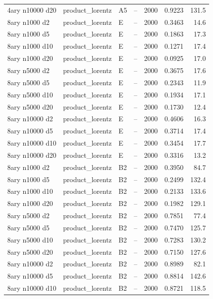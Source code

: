 \begin{longtable}{llllrrr}
4ary n10000 d20 & product\_lorentz & A5 & -- & 2000 & 0.9223 & 131.5 \\
8ary n1000 d2 & product\_lorentz & E & -- & 2000 & 0.3463 & 14.6 \\
8ary n1000 d5 & product\_lorentz & E & -- & 2000 & 0.1863 & 17.3 \\
8ary n1000 d10 & product\_lorentz & E & -- & 2000 & 0.1271 & 17.4 \\
8ary n1000 d20 & product\_lorentz & E & -- & 2000 & 0.0925 & 17.0 \\
8ary n5000 d2 & product\_lorentz & E & -- & 2000 & 0.3675 & 17.6 \\
8ary n5000 d5 & product\_lorentz & E & -- & 2000 & 0.2343 & 11.9 \\
8ary n5000 d10 & product\_lorentz & E & -- & 2000 & 0.1934 & 17.1 \\
8ary n5000 d20 & product\_lorentz & E & -- & 2000 & 0.1730 & 12.4 \\
8ary n10000 d2 & product\_lorentz & E & -- & 2000 & 0.4606 & 16.3 \\
8ary n10000 d5 & product\_lorentz & E & -- & 2000 & 0.3714 & 17.4 \\
8ary n10000 d10 & product\_lorentz & E & -- & 2000 & 0.3454 & 17.7 \\
8ary n10000 d20 & product\_lorentz & E & -- & 2000 & 0.3316 & 13.2 \\
8ary n1000 d2 & product\_lorentz & B2 & -- & 2000 & 0.3950 & 84.7 \\
8ary n1000 d5 & product\_lorentz & B2 & -- & 2000 & 0.2499 & 132.4 \\
8ary n1000 d10 & product\_lorentz & B2 & -- & 2000 & 0.2133 & 133.6 \\
8ary n1000 d20 & product\_lorentz & B2 & -- & 2000 & 0.1982 & 129.1 \\
8ary n5000 d2 & product\_lorentz & B2 & -- & 2000 & 0.7851 & 77.4 \\
8ary n5000 d5 & product\_lorentz & B2 & -- & 2000 & 0.7470 & 125.7 \\
8ary n5000 d10 & product\_lorentz & B2 & -- & 2000 & 0.7283 & 130.2 \\
8ary n5000 d20 & product\_lorentz & B2 & -- & 2000 & 0.7150 & 127.6 \\
8ary n10000 d2 & product\_lorentz & B2 & -- & 2000 & 0.8989 & 82.1 \\
8ary n10000 d5 & product\_lorentz & B2 & -- & 2000 & 0.8814 & 142.6 \\
8ary n10000 d10 & product\_lorentz & B2 & -- & 2000 & 0.8721 & 118.5 \\

\end{longtable}
